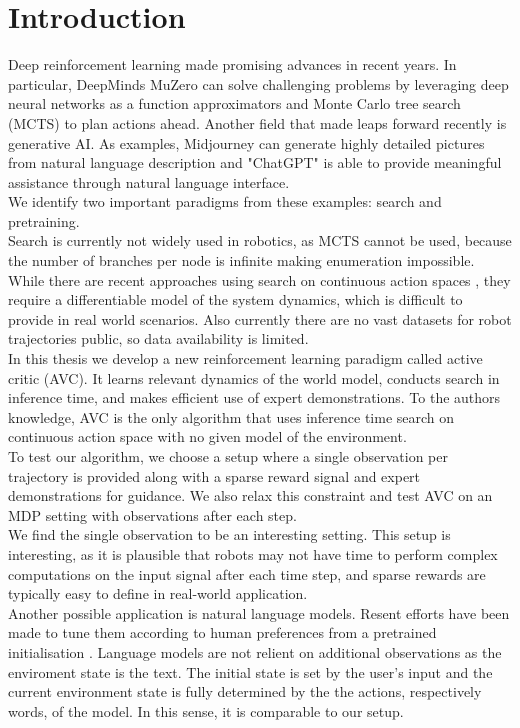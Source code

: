 \chapter{Introduction}
\label{chapter:Introduction}
Deep reinforcement learning made promising advances in recent years. In particular, DeepMinds MuZero \cite{MUZero} can solve challenging problems by leveraging deep neural networks as a function 
approximators and Monte Carlo tree search (MCTS) to plan actions ahead. 
Another field that made leaps forward recently is generative AI. As examples, Midjourney \cite{midjourney} 
can generate highly detailed pictures from natural 
language description and "ChatGPT" is able to provide meaningful assistance through natural language interface. \\
We identify two important paradigms from these examples: search and pretraining. \\
Search is currently not widely used in robotics, as MCTS cannot be used, because the number of branches per node is infinite making enumeration impossible. While there are recent approaches 
using search on continuous action spaces \cite{Manna2022} \cite{Lee_Jeon_Kim_Kim_2020}, they require a differentiable model of the system dynamics, which is difficult to provide in real world scenarios. 
Also currently there are no vast datasets for robot trajectories public, so data availability is limited.\\ 
In this thesis we develop a new reinforcement learning 
paradigm called active critic (AVC). It learns relevant dynamics of the world model, conducts search in inference time, and makes efficient use of expert demonstrations. 
To the authors knowledge, AVC is the only algorithm that uses inference time search on continuous action space with no given model of the environment.\\
To test our algorithm, we choose a setup where a single observation per trajectory is provided along with a sparse reward signal and expert demonstrations for guidance. 
We also relax this constraint and test AVC on an MDP setting with observations after each step.\\

We find the single observation to be an interesting setting. This setup is interesting, as it is plausible that robots may not have time to perform complex computations 
on the input signal after each time step, and sparse rewards are typically easy to define in real-world application.\\
Another possible application is natural language models. Resent efforts have been made to tune 
them according to human preferences from a pretrained initialisation \cite{cite:ChatGPT}. Language models are not relient on additional observations as the enviroment state is the 
text. The initial state is set by the user's input and the current environment state is fully determined by the the actions, respectively words, of the model. 
In this sense, it is comparable to our setup.\\


